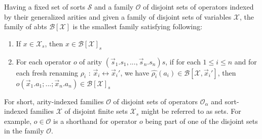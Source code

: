 Having a fixed set of sorts $\mathcal{S}$ and a family $\mathcal{O}$ of disjoint sets of operators indexed by their generalized arities and given a family of disjoint sets of variables $\mathcal{X}$, the family of abts $\mathcal{B}[\mathcal{X}]$ is the smallest family satisfying following:

\begin{enumerate}
    \item If $x \in \mathcal{X}_s$, then $x \in \mathcal{B}[\mathcal{X}]_s$
    \item For each operator $o$ of arity $(\vec{s}_1.s_1,...,\vec{s}_n.s_n)s$, if for each $1 \leq i \leq n$ and for each fresh renaming $\rho_i$ : $\vec{x}_i \leftrightarrow \vec{x}_i'$, we have $\hat{\rho_i}(a_i) \in \mathcal{B}[\mathcal{X}, \vec{x}_i']$, then $o(\vec{x}_1.a_1;...;\vec{x}_n.a_n) \in \mathcal{B}[\mathcal{X}]_s$
\end{enumerate}

For short, arity-indexed families $\mathcal{O}$ of disjoint sets of operators $\mathcal{O}_\alpha$ and sort-indexed families $\mathcal{X}$ of disjoint finite sets $\mathcal{X}_s$ might be referred to as sets. For example, $o \in \mathcal{O}$ is a shorthand for operator $o$ being part of one of the disjoint sets in the family $\mathcal{O}$.